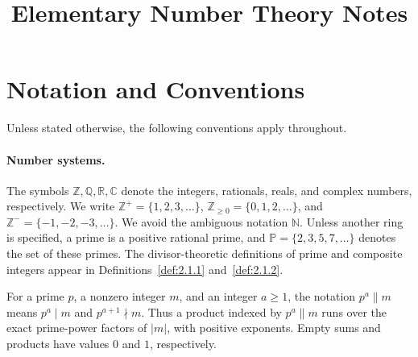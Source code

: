 \documentclass[11pt]{article}
\title{Elementary Number Theory Notes}
\author{}
\date{}
\theoremstyle{ntstyle}
\newcommand{\Primes}{\mathbb{P}}
\begin{document}
\maketitle
\clearpage
\begingroup
\setlength{\parskip}{0pt}
\tableofcontents
\endgroup
\clearpage

\section*{Notation and Conventions}

\noindent Unless stated otherwise, the following conventions apply throughout.

\paragraph*{Number systems.}
The symbols $\mathbb{Z},\mathbb{Q},\mathbb{R},\mathbb{C}$ denote the integers, rationals, reals, and complex numbers, respectively. We write $\mathbb{Z}^+=\{1,2,3,\ldots\}$, $\mathbb{Z}_{\ge0}=\{0,1,2,\ldots\}$, and $\mathbb{Z}^-=\{-1,-2,-3,\ldots\}$. We avoid the ambiguous notation $\mathbb{N}$. Unless another ring is specified, a prime is a positive rational prime, and $\Primes=\{2,3,5,7,\ldots\}$ denotes the set of these primes. The divisor-theoretic definitions of prime and composite integers appear in Definitions~\ref{def:2.1.1} and~\ref{def:2.1.2}.

For a prime $p$, a nonzero integer $m$, and an integer $a\ge1$, the notation $p^a\parallel m$ means $p^a\mid m$ and $p^{a+1}\nmid m$. Thus a product indexed by $p^a\parallel m$ runs over the exact prime-power factors of $|m|$, with positive exponents. Empty sums and products have values $0$ and $1$, respectively.
\end{document}
